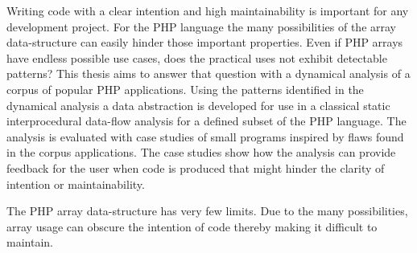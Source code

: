 Writing code with a clear intention and high maintainability is important for any development project. For the PHP language the many possibilities of the array data-structure can easily hinder those important properties. Even if PHP arrays have endless possible use cases, does the practical uses not exhibit detectable patterns? This thesis aims to answer that question with a dynamical analysis of a corpus of popular PHP applications. Using the patterns identified in the dynamical analysis a data abstraction is developed for use in a classical static interprocedural data-flow analysis for a defined subset of the PHP language. The analysis is evaluated with case studies of small programs inspired by flaws found in the corpus applications. The case studies show how the analysis can provide feedback for the user when code is produced that might hinder the clarity of intention or maintainability.

The PHP array data-structure has very few limits. Due to the many possibilities, array usage can obscure the intention of code thereby making it difficult to maintain. 